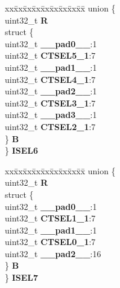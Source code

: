 \begin{DoxyCompactItemize}
\begin{tabbing}
\end{tabbing}\item 
\mbox{\label{structSIU__tag_a5b1801fbe76fc5f9f5760f69a67dba31}} 
\begin{tabbing}
xx\=xx\=xx\=xx\=xx\=xx\=xx\=xx\=xx\=\kill
union \{\\
\>uint32\_t {\bfseries R}\\
\>struct \{\\
\>\>uint32\_t {\bfseries \_\_pad0\_\_}:1\\
\>\>uint32\_t {\bfseries CTSEL5\_1}:7\\
\>\>uint32\_t {\bfseries \_\_pad1\_\_}:1\\
\>\>uint32\_t {\bfseries CTSEL4\_1}:7\\
\>\>uint32\_t {\bfseries \_\_pad2\_\_}:1\\
\>\>uint32\_t {\bfseries CTSEL3\_1}:7\\
\>\>uint32\_t {\bfseries \_\_pad3\_\_}:1\\
\>\>uint32\_t {\bfseries CTSEL2\_1}:7\\
\>\} {\bfseries B}\\
\} {\bfseries ISEL6}\\

\end{tabbing}\item 
\mbox{\label{structSIU__tag_a6787bdff3a1301aca2b9ebc2e0999bcc}} 
\begin{tabbing}
xx\=xx\=xx\=xx\=xx\=xx\=xx\=xx\=xx\=\kill
union \{\\
\>uint32\_t {\bfseries R}\\
\>struct \{\\
\>\>uint32\_t {\bfseries \_\_pad0\_\_}:1\\
\>\>uint32\_t {\bfseries CTSEL1\_1}:7\\
\>\>uint32\_t {\bfseries \_\_pad1\_\_}:1\\
\>\>uint32\_t {\bfseries CTSEL0\_1}:7\\
\>\>uint32\_t {\bfseries \_\_pad2\_\_}:16\\
\>\} {\bfseries B}\\
\} {\bfseries ISEL7}\\


\end{tabbing}
\end{DoxyCompactItemize}
